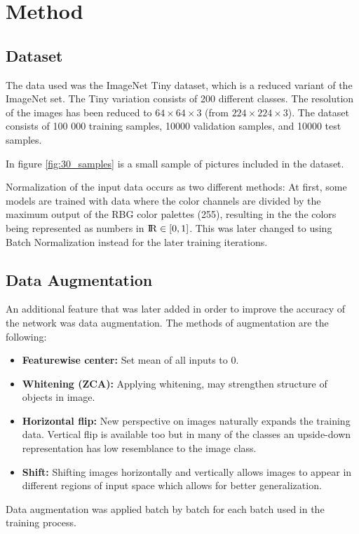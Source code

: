 \documentclass{kthreport}
\begin{document}
\section{Method}

\subsection{Dataset}
The data used was the ImageNet Tiny dataset, which is a reduced variant of the ImageNet set. The Tiny variation consists of 200 different classes. The resolution of the images has been reduced to $64\times64\times3$ (from  $224\times224\times3$). The dataset consists of 100 000 training samples, 10000 validation samples, and 10000 test samples.

In figure \ref{fig:30_samples} is a small sample of pictures included in the dataset.


\FloatBarrier
Normalization of the input data occurs as two different methods: At first, some models are trained with data where the color channels are divided by the maximum output of the RBG color palettes (255), resulting in the the colors being represented as numbers in ${\rm I\!R} \in [0,1]$.
This was later changed to using Batch Normalization instead for the later training iterations.

\subsection{Data Augmentation}
An additional feature that was later added in order to improve the accuracy of the network was data augmentation. The methods of augmentation are the following:

\begin{itemize}
  \item \textbf{Featurewise center:} Set mean of all inputs to 0.
  \item \textbf{Whitening (ZCA):} Applying whitening, may strengthen structure of objects in image.
  \item \textbf{Horizontal flip:} New perspective on images naturally expands the training data. Vertical flip is available too but in many of the classes an upside-down representation has low resemblance to the image class.
  \item \textbf{Shift:} Shifting images horizontally and vertically allows images to appear in different regions of input space which allows for better generalization.
\end{itemize}
Data augmentation was applied batch by batch for each batch used in the training process.
\end{document}
